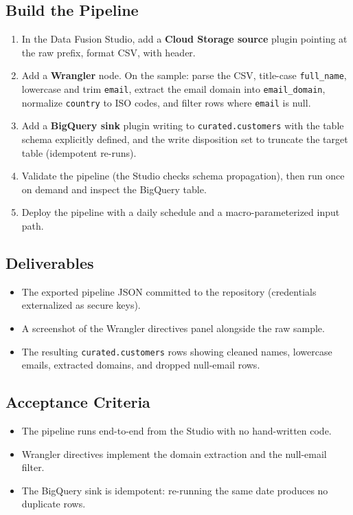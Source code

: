 \subsection{Build the Pipeline}
\begin{enumerate}
    \item In the Data Fusion Studio, add a \textbf{Cloud Storage source} plugin pointing at the raw prefix, format CSV, with header.
    \item Add a \textbf{Wrangler} node. On the sample: parse the CSV, title-case \texttt{full\_name}, lowercase and trim \texttt{email}, extract the email domain into \texttt{email\_domain}, normalize \texttt{country} to ISO codes, and filter rows where \texttt{email} is null.
    \item Add a \textbf{BigQuery sink} plugin writing to \texttt{curated.customers} with the table schema explicitly defined, and the write disposition set to truncate the target table (idempotent re-runs).
    \item Validate the pipeline (the Studio checks schema propagation), then run once on demand and inspect the BigQuery table.
    \item Deploy the pipeline with a daily schedule and a macro-parameterized input path.
\end{enumerate}

\subsection*{Deliverables}
\begin{itemize}
    \item The exported pipeline JSON committed to the repository (credentials externalized as secure keys).
    \item A screenshot of the Wrangler directives panel alongside the raw sample.
    \item The resulting \texttt{curated.customers} rows showing cleaned names, lowercase emails, extracted domains, and dropped null-email rows.
\end{itemize}

\subsection*{Acceptance Criteria}
\begin{itemize}
    \item The pipeline runs end-to-end from the Studio with no hand-written code.
    \item Wrangler directives implement the domain extraction and the null-email filter.
    \item The BigQuery sink is idempotent: re-running the same date produces no duplicate rows.
\end{itemize}

